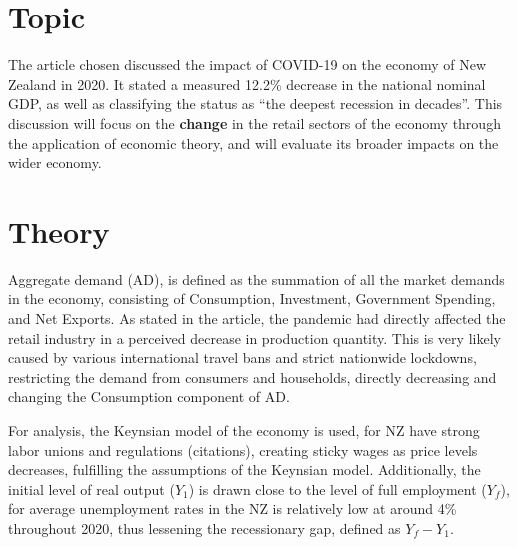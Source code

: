 \documentclass[a4paper,12pt]{article}
\begin{document}


\section*{Topic}
The article chosen discussed the impact of COVID-19 on the economy of New Zealand in 2020. It stated a measured 12.2\% decrease in the national nominal GDP, as well as classifying the status as ``the deepest recession in decades''. This discussion will focus on the \textbf{change} in the retail sectors of the economy through the application of economic theory, and will evaluate its broader impacts on the wider economy.

\section*{Theory}
Aggregate demand (AD), is defined as the summation of all the market demands in the economy, consisting of Consumption, Investment, Government Spending, and Net Exports. As stated in the article, the pandemic had directly affected the retail industry in a perceived decrease in production quantity. This is very likely caused by various international travel bans and strict nationwide lockdowns, restricting the demand from consumers and households, directly decreasing and changing the Consumption component of AD.

For analysis, the Keynsian model of the economy is used, for NZ have strong labor unions and regulations (citations), creating sticky wages as price levels decreases, fulfilling the assumptions of the Keynsian model. Additionally, the initial level of real output ($Y_1$) is drawn close to the level of full employment ($Y_f$), for average unemployment rates in the NZ is relatively low at around 4\% throughout 2020, thus lessening the recessionary gap, defined as $Y_f-Y_1$.
\end{document}
